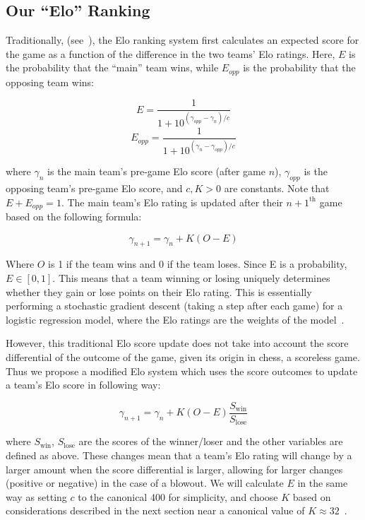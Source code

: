 \documentclass{article}
\begin{document}
\subsection{Our ``Elo'' Ranking}
Traditionally, (see~\cite{mediumRatingSystem}), the Elo ranking system first calculates an expected score for the game as a function of the difference in the two teams' Elo ratings. Here, $E$ is the probability that the ``main'' team wins, while $E_{opp}$ is the probability that the opposing team wins:

\begin{equation}\label{eq:E}
E = \frac{1}{1+10^{(\gamma_{opp}-\gamma_n)/c}}
\end{equation}
\begin{equation}\label{eq:E_opp}
E_{opp} = \frac{1}{1+10^{(\gamma_n-\gamma_{opp})/c}}
\end{equation}

where $\gamma_n$ is the main team's pre-game Elo score (after game $n$), $\gamma_{opp}$ is the opposing team's pre-game Elo score, and $c, K > 0$ are constants. Note that $E + E_{opp} = 1$. The main team's Elo rating is updated after their $n+1^{\text{th}}$ game based on the following formula:

\begin{equation}
\gamma_{n+1} = \gamma_n + K(O - E)
\end{equation}


Where $O$ is 1 if the team wins and 0 if the team loses. Since E is a probability,  $E \in [0, 1]$. This means that a team winning or losing uniquely determines whether they gain or lose points on their Elo rating. This is essentially performing a stochastic gradient descent (taking a step after each game) for a logistic regression model, where the Elo ratings are the weights of the model~\cite{stmorseStatisticalLearning}.

However, this traditional Elo score update does not take into account the score differential of the outcome of the game, given its origin in chess, a scoreless game. Thus we propose a modified Elo system which uses the score outcomes to update a team's Elo score in following way: 


\begin{equation}
\label{multiplyUpdate}
\gamma_{n+1} = \gamma_n + K(O - E)\frac{S_{\text{win}}}{S_{\text{lose}}}
\end{equation}


where $S_{\text{win}}$, $S_{\text{lose}}$ are the scores of the winner/loser and the other variables are defined as above. These changes mean that a team's Elo rating will change by a larger amount when the score differential is larger, allowing for larger changes (positive or negative) in the case of a blowout. We will calculate $E$ in the same way as setting $c$ to the canonical 400 for simplicity, and choose $K$ based on considerations described in the next section near a canonical value  of $K\approx 32$~\cite{mediumRatingSystem}.
\end{document}
